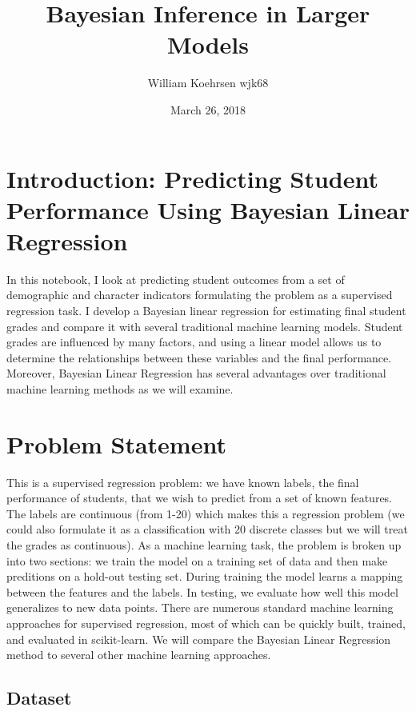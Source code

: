 \documentclass[12pt]{article}
\title{Bayesian Inference in Larger Models}
\author{William Koehrsen wjk68}
\date{March 26, 2018}
\begin{document}
    
    
    \maketitle
    \tableofcontents
    
   

    \hypertarget{introduction}{%
\section{Introduction: Predicting Student Performance Using Bayesian Linear Regression}\label{introduction}}

In this notebook, I look at predicting student outcomes from a set of
demographic and character indicators formulating the problem as a
supervised regression task. I develop a Bayesian linear regression for
estimating final student grades and compare it with several traditional
machine learning models. Student grades are influenced by many factors,
and using a linear model allows us to determine the relationships
between these variables and the final performance. Moreover, Bayesian
Linear Regression has several advantages over traditional machine
learning methods as we will examine.

\hypertarget{problem-statement}{%
\section{Problem Statement}\label{problem-statement}}

This is a supervised regression problem: we have known labels, the final
performance of students, that we wish to predict from a set of known
features. The labels are continuous (from 1-20) which makes this a
regression problem (we could also formulate it as a classification with
20 discrete classes but we will treat the grades as continuous). As a
machine learning task, the problem is broken up into two sections: we
train the model on a training set of data and then make preditions on a
hold-out testing set. During training the model learns a mapping between
the features and the labels. In testing, we evaluate how well this model
generalizes to new data points. There are numerous standard machine
learning approaches for supervised regression, most of which can be
quickly built, trained, and evaluated in scikit-learn. We will compare
the Bayesian Linear Regression method to several other machine learning
approaches.

\hypertarget{dataset}{%
\subsection{Dataset}\label{dataset}}
\end{document}
